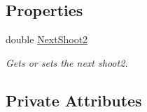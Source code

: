 \subsection*{Properties}
\begin{DoxyCompactItemize}
\item 
double \hyperlink{classXaria_1_1Enemies_1_1Boss3_a82934fbc14963fb958807469ee713987}{Next\+Shoot2}
\begin{DoxyCompactList}\small\item\em Gets or sets the next shoot2. \end{DoxyCompactList}\end{DoxyCompactItemize}
\subsection*{Private Attributes}
